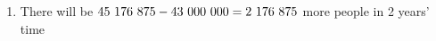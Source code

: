 {\begin{mdframed}[linewidth=4, leftmargin=40, rightmargin=40]
\begin{exercise}
\begin{enumerate}[noitemsep, label=\textbf{Step} \textbf{\arabic*}. ]
{\begin{equation}
      \end{equation}
    }{%
    \setlength{\mymathboxwidth}{\columnwidth}
      \addtolength{\mymathboxwidth}{-48pt}
    \par\vspace{12pt}\noindent\begin{minipage}{\columnwidth}
    \parbox[t]{\mymathboxwidth}{\large$
    \mathrm{A}=P{\left(1+i\right)}^{n}=43\phantom{\rule{3.33333pt}{0ex}}000\phantom{\rule{3.33333pt}{0ex}}000{\left(1+0,025\right)}^{2}=45\phantom{\rule{3.33333pt}{0ex}}176\phantom{\rule{3.33333pt}{0ex}}875$}\hfill
    \parbox[t]{48pt}{\raggedleft 
    (3.32)}
    \end{minipage}\vspace{12pt}\par
    }%
        \item  
        \label{m39334*id74768}There will be $45\phantom{\rule{3.33333pt}{0ex}}176\phantom{\rule{3.33333pt}{0ex}}875-43\phantom{\rule{3.33333pt}{0ex}}000\phantom{\rule{3.33333pt}{0ex}}000=2\phantom{\rule{3.33333pt}{0ex}}176\phantom{\rule{3.33333pt}{0ex}}875$ more people in 2 years' time
 \par 
        \end{enumerate}
    \end{exercise}
    \end{mdframed}
    }
    \noindent
\label{m39334*secfhsst!!!underscore!!!id3026}\vspace{.5cm} 
      \noindent
